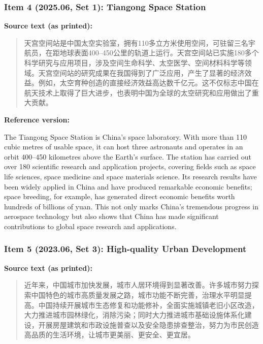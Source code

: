\subsubsection*{Item 4 (2025.06, Set 1): Tiangong Space Station}

\noindent\textbf{Source text (as printed):}
\begin{quote}
天宫空间站是中国太空实验室，拥有110多立方米使用空间，可驻留三名宇航员，在距地球表面400--450公里的轨道上运行。天宫空间站已实施180多个科学研究与应用项目，涉及空间生命科学、太空医学、空间材料科学等领域。天宫空间站的研究成果在我国得到了广泛应用，产生了显著的经济效益。例如，太空育种创造的直接经济效益高达数千亿元。这不仅标志中国在航天技术上取得了巨大进步，也表明中国为全球的太空研究和应用做出了重大贡献。
\end{quote}

\noindent\textbf{Reference version:}
\par\smallskip
\noindent The Tiangong Space Station is China's space laboratory. With more than 110 cubic metres of usable space, it can host three astronauts and operates in an orbit 400--450 kilometres above the Earth's surface. The station has carried out over 180 scientific research and application projects, covering fields such as space life sciences, space medicine and space materials science. Its research results have been widely applied in China and have produced remarkable economic benefits; space breeding, for example, has generated direct economic benefits worth hundreds of billions of yuan. This not only marks China's tremendous progress in aerospace technology but also shows that China has made significant contributions to global space research and applications.
\par\medskip

\subsubsection*{Item 5 (2023.06, Set 3): High-quality Urban Development}

\noindent\textbf{Source text (as printed):}
\begin{quote}
近年来，中国城市加快发展，城市人居环境得到显著改善。许多城市努力探索中国特色的城市高质量发展之路，城市功能不断完善，治理水平明显提高。中国持续开展城市生态修复和功能修补，全面实施城镇老旧小区改造，大力推进城市园林绿化，消除污染；同时大力推进城市基础设施体系化建设，开展房屋建筑和市政设施普查以及安全隐患排查整治，努力为市民创造高品质的生活环境，让城市更美丽、更安全、更宜居。
\end{quote}

